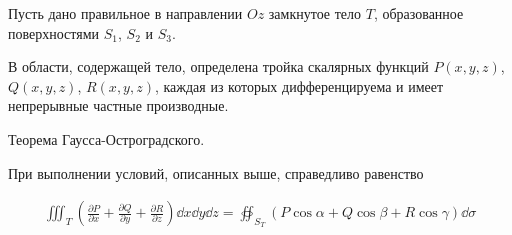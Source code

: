 
\begin{twocolumns}
  
  \columnbreak

  Пусть дано правильное в направлении \(Oz\) замкнутое тело \(T\), образованное
  поверхностями \(S_{1}\), \(S_{2}\) и \(S_{3}\).

  В области, содержащей тело, определена тройка скалярных функций
  \(P(x, y, z)\), \(Q(x, y, z)\), \(R(x, y, z)\), каждая из которых
  дифференцируема и имеет непрерывные частные производные.
\end{twocolumns}
  
\begin{theorem}\label{GO}
  Теорема Гаусса-Остроградского.

  При выполнении условий, описанных выше, справедливо равенство
  
  \begin{align*}
    \iiint_{T} \left(
      \frac{\partial P}{\partial x} +
      \frac{\partial Q}{\partial y} +
      \frac{\partial R}{\partial z}
    \right) \dd x \dd y \dd z
    =
    \oiint_{S_{T}} \left(
      P \cos \alpha +
      Q \cos \beta +
      R \cos \gamma
    \right) \dd \sigma
  \end{align*}
\end{theorem}  
